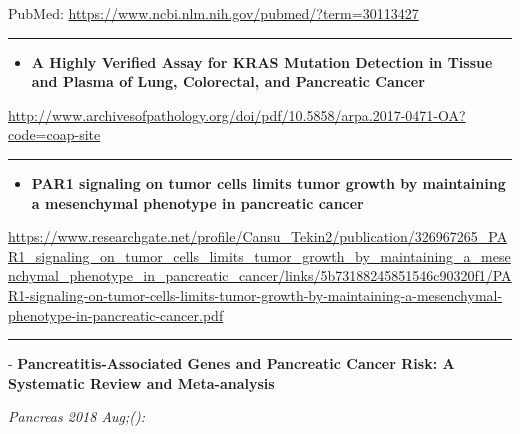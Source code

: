 \documentclass[]{article}
\providecommand{\tightlist}{%
  \setlength{\itemsep}{0pt}\setlength{\parskip}{0pt}}
\begin{document}
PubMed: \url{https://www.ncbi.nlm.nih.gov/pubmed/?term=30113427}

{}

{}

\begin{center}\rule{0.5\linewidth}{\linethickness}\end{center}

\begin{itemize}
\tightlist
\item
  \textbf{A Highly Verified Assay for KRAS Mutation Detection in Tissue
  and Plasma of Lung, Colorectal, and Pancreatic Cancer}
\end{itemize}

\url{http://www.archivesofpathology.org/doi/pdf/10.5858/arpa.2017-0471-OA?code=coap-site}

\begin{center}\rule{0.5\linewidth}{\linethickness}\end{center}

\begin{itemize}
\tightlist
\item
  \textbf{PAR1 signaling on tumor cells limits tumor growth by
  maintaining a mesenchymal phenotype in pancreatic cancer}
\end{itemize}

\url{https://www.researchgate.net/profile/Cansu_Tekin2/publication/326967265_PAR1_signaling_on_tumor_cells_limits_tumor_growth_by_maintaining_a_mesenchymal_phenotype_in_pancreatic_cancer/links/5b73188245851546c90320f1/PAR1-signaling-on-tumor-cells-limits-tumor-growth-by-maintaining-a-mesenchymal-phenotype-in-pancreatic-cancer.pdf}

\begin{center}\rule{0.5\linewidth}{\linethickness}\end{center}

 - \textbf{Pancreatitis-Associated Genes and Pancreatic Cancer Risk: A
Systematic Review and Meta-analysis}

\emph{Pancreas 2018 Aug;():}
\end{document}
